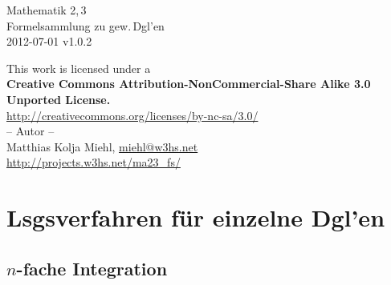 \documentclass[a4paper,10pt,titlepage]{scrartcl}
\makeatletter
\newcommand{\projectURL}{http://projects.w3hs.net/ma23\_fs/}
\newcommand{\thisdocDATE}{2012-07-01 v1.0.2}
\newcommand{\myNAME}{Matthias Kolja Miehl}
\newcommand{\myEMAIL}{miehl@w3hs.net}
\makeatother
\begin{document}

\begin{titlepage}
  \vspace*{\fill}
  \begin{center}
    \huge
    Mathematik 2,\,3\\
    Formelsammlung zu gew.\,Dgl'en\\
    \vspace{1.5cm}
    \large
    \thisdocDATE
  \end{center}
  \vspace*{\fill}
  \begin{center}{\fontsize{9pt}{11pt}\selectfont
    This work is licensed under a\\[1em]
    \textbf{Creative Commons Attribution-NonCommercial-Share Alike 3.0 Unported License.\\[1em]}
    \url{http://creativecommons.org/licenses/by-nc-sa/3.0/}\\
  }
  \vspace*{\fill}
%
  -- Autor -- \medskip\\
  \myNAME, \href{mailto:\myEMAIL}{\myEMAIL}\smallskip\\
  \url{\projectURL}
  \vspace*{1cm}
  \end{center}
\end{titlepage}

\newpage

\setcounter{page}{1}


\section*{Lsgsverfahren für einzelne Dgl'en}
\label{sec:lsgsverfahren_fuer_einzelne_dglen}

\subsection*{$n$-fache Integration}
\label{sec:n-fache_integration}
\end{document}
